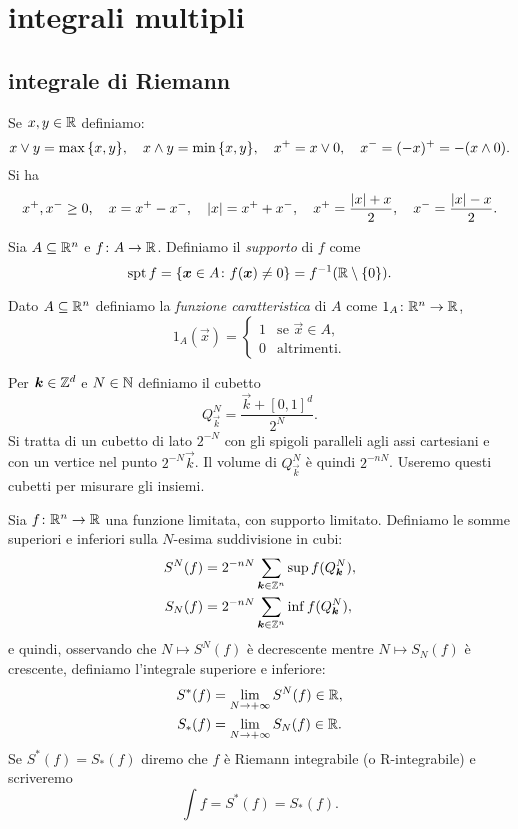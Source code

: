 \chapter{integrali multipli}

\section{integrale di Riemann}
Se $x,y\in {\mathbb R}$ definiamo:
\[
    x \vee y = \max{\left\{ x,y \right\}},
    \quad
    x \wedge y = \min{\left\{ x,y \right\}},
    \quad
    x^+ = x \vee 0,
    \quad
    x^- = (-x)^+ = -(x\wedge 0).
\]
Si ha
\[
    x^+,x^-\ge 0,
    \quad
    x = x^+ - x^-,
    \quad 
    {\left|x\right|} = x^+ + x^-,
    \quad
    x^+ = \frac{{\left|x\right|}+x}{2},
    \quad
    x^- = \frac{{\left|x\right|}-x}{2}.
\]

Sia $A\subseteq {\mathbb R}^n$ e $f\colon A \to {\mathbb R}$. 
Definiamo il \emph{supporto} di $f$ come 
\[
 \operatorname{spt} f 
    = {\left\{ \boldsymbol x \in A \colon f(\boldsymbol x) \neq 0 \right\}}
    = f^{-1}({\mathbb R}\setminus{\left\{ 0 \right\}}).
\]

Dato $A\subseteq {\mathbb R}^n$ definiamo la \emph{funzione caratteristica}
di $A$ come $1_A\colon {\mathbb R}^n \to {\mathbb R}$,
\[
  1_A(\vec x) = \begin{cases}
    1 & \text{se $\vec x \in A$,}\\
    0 & \text{altrimenti.}
  \end{cases}
\]

Per $\boldsymbol k \in {\mathbb Z}^d$ e $N\in {\mathbb N}$ definiamo 
il cubetto 
\[
  Q^N_{\vec k} = \frac{\vec k + [0,1]^d}{2^N}.
\]
Si tratta di un cubetto di lato $2^{-N}$ con gli spigoli paralleli 
agli assi cartesiani e con un vertice nel punto $2^{-N} \vec k$.
Il volume di $Q^N_{\vec k}$ è quindi $2^{-nN}$.
Useremo questi cubetti per misurare gli insiemi.

\begin{definition}
  \label{def:integrale_riemann}
Sia $f\colon {\mathbb R}^n \to {\mathbb R}$ una funzione limitata, 
con supporto limitato.
Definiamo le somme superiori e inferiori sulla $N$-esima suddivisione in cubi:
\begin{align*}
    S^N(f) &= 2^{-nN}\sum_{\boldsymbol k\in {\mathbb Z}^n} \sup f(Q^N_{\boldsymbol k}), \\
    S_N(f) &= 2^{-nN}\sum_{\boldsymbol k\in {\mathbb Z}^n} \inf f(Q^N_{\boldsymbol k}),
\end{align*}
e quindi, osservando che $N\mapsto S^N(f)$ è decrescente 
mentre $N\mapsto S_N(f)$ è crescente, definiamo
l'integrale superiore e inferiore:
\begin{align*}
    S^*(f) &= \lim_{N\to +\infty} S^N(f) \in {\mathbb R}, \\
    S_*(f) &= \lim_{N\to +\infty} S_N(f) \in {\mathbb R}.
\end{align*}
Se $S^*(f)=S_*(f)$ diremo che $f$ è Riemann integrabile (o R-integrabile)
e scriveremo
\[
  \int f = S^*(f) = S_*(f).
\]
\end{definition}

